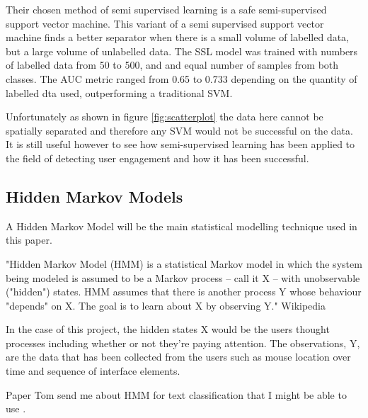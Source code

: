 \documentclass{article}
\begin{document}
Their chosen method of semi supervised learning is a safe semi-supervised support vector machine.
This variant of a semi supervised support vector machine finds a better separator when there is a small volume of labelled data, but a large volume of unlabelled data.
The SSL model was trained with numbers of labelled data from 50 to 500, and and equal number of samples from both classes.
The AUC metric ranged from 0.65 to 0.733 depending on the quantity of labelled dta used, outperforming a traditional SVM.

Unfortunately as shown in figure \ref{fig:scatterplot} the data here cannot be spatially separated and therefore any SVM would not be successful on the data. 
It is still useful however to see how semi-supervised learning has been applied to the field of detecting user engagement and how it has been successful.

%   

\subsection{Hidden Markov Models}


A Hidden Markov Model will be the main statistical modelling technique used in this paper.

"Hidden Markov Model (HMM) is a statistical Markov model in which the system being modeled is assumed to be a Markov process – call it X – with unobservable ("hidden") states. 
HMM assumes that there is another process Y whose behaviour "depends" on X.
The goal is to learn about X by observing Y." Wikipedia

In the case of this project, the hidden states X would be the users thought processes including whether or not they're paying attention.
The observations, Y, are the data that has been collected from the users such as mouse location over time and sequence of interface elements.

Paper Tom send me about HMM for text classification that I might be able to use \cite{collins2016tagging}.
\end{document}
